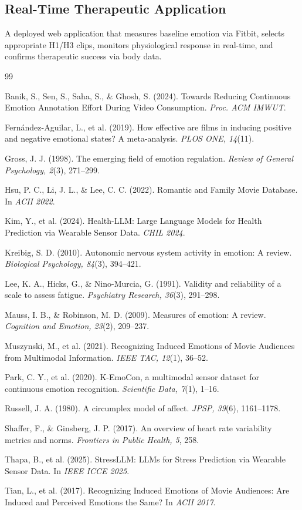 \documentclass[11pt, a4paper]{report}
\begin{document}
\subsection{Real-Time Therapeutic Application}
A deployed web application that measures baseline emotion via Fitbit, selects appropriate H1/H3 clips, monitors physiological response in real-time, and confirms therapeutic success via body data.


\begin{thebibliography}{99}

Banik, S., Sen, S., Saha, S., \& Ghosh, S. (2024). Towards Reducing Continuous Emotion Annotation Effort During Video Consumption. \textit{Proc. ACM IMWUT}.

Fern\'{a}ndez-Aguilar, L., et al. (2019). How effective are films in inducing positive and negative emotional states? A meta-analysis. \textit{PLOS ONE, 14}(11).

Gross, J. J. (1998). The emerging field of emotion regulation. \textit{Review of General Psychology, 2}(3), 271--299.

Hsu, P. C., Li, J. L., \& Lee, C. C. (2022). Romantic and Family Movie Database. In \textit{ACII 2022}.

Kim, Y., et al. (2024). Health-LLM: Large Language Models for Health Prediction via Wearable Sensor Data. \textit{CHIL 2024}.

Kreibig, S. D. (2010). Autonomic nervous system activity in emotion: A review. \textit{Biological Psychology, 84}(3), 394--421.

Lee, K. A., Hicks, G., \& Nino-Murcia, G. (1991). Validity and reliability of a scale to assess fatigue. \textit{Psychiatry Research, 36}(3), 291--298.

Mauss, I. B., \& Robinson, M. D. (2009). Measures of emotion: A review. \textit{Cognition and Emotion, 23}(2), 209--237.

Muszynski, M., et al. (2021). Recognizing Induced Emotions of Movie Audiences from Multimodal Information. \textit{IEEE TAC, 12}(1), 36--52.

Park, C. Y., et al. (2020). K-EmoCon, a multimodal sensor dataset for continuous emotion recognition. \textit{Scientific Data, 7}(1), 1--16.

Russell, J. A. (1980). A circumplex model of affect. \textit{JPSP, 39}(6), 1161--1178.

Shaffer, F., \& Ginsberg, J. P. (2017). An overview of heart rate variability metrics and norms. \textit{Frontiers in Public Health, 5}, 258.

Thapa, B., et al. (2025). StressLLM: LLMs for Stress Prediction via Wearable Sensor Data. In \textit{IEEE ICCE 2025}.

Tian, L., et al. (2017). Recognizing Induced Emotions of Movie Audiences: Are Induced and Perceived Emotions the Same? In \textit{ACII 2017}.

\end{thebibliography}
\end{document}
